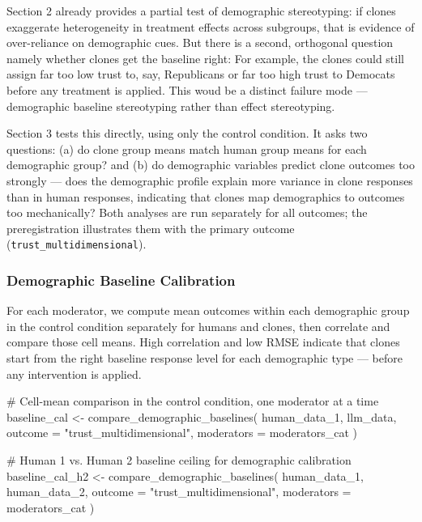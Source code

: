\documentclass[
  letterpaper,
  DIV=11,
  numbers=noendperiod]{scrartcl}
\newenvironment{Shaded}{\begin{snugshade}}{\end{snugshade}}
\newcommand{\AttributeTok}[1]{\textcolor[rgb]{0.40,0.45,0.13}{#1}}
\newcommand{\CommentTok}[1]{\textcolor[rgb]{0.37,0.37,0.37}{#1}}
\newcommand{\FunctionTok}[1]{\textcolor[rgb]{0.28,0.35,0.67}{#1}}
\newcommand{\NormalTok}[1]{\textcolor[rgb]{0.00,0.23,0.31}{#1}}
\newcommand{\OtherTok}[1]{\textcolor[rgb]{0.00,0.23,0.31}{#1}}
\newcommand{\StringTok}[1]{\textcolor[rgb]{0.13,0.47,0.30}{#1}}
\begin{document}
Section 2 already provides a partial test of demographic stereotyping:
if clones exaggerate heterogeneity in treatment effects across
subgroups, that is evidence of over-reliance on demographic cues. But
there is a second, orthogonal question namely whether clones get the
baseline right: For example, the clones could still assign far too low
trust to, say, Republicans or far too high trust to Democats before any
treatment is applied. This woud be a distinct failure mode ---
demographic baseline stereotyping rather than effect stereotyping.

Section 3 tests this directly, using only the control condition. It asks
two questions: (a) do clone group means match human group means for each
demographic group? and (b) do demographic variables predict clone
outcomes too strongly --- does the demographic profile explain more
variance in clone responses than in human responses, indicating that
clones map demographics to outcomes too mechanically? Both analyses are
run separately for all outcomes; the preregistration illustrates them
with the primary outcome (\texttt{trust\_multidimensional}).

\subsubsection{Demographic Baseline
Calibration}\label{demographic-baseline-calibration-1}

For each moderator, we compute mean outcomes within each demographic
group in the control condition separately for humans and clones, then
correlate and compare those cell means. High correlation and low RMSE
indicate that clones start from the right baseline response level for
each demographic type --- before any intervention is applied.

\begin{Shaded}
\begin{Highlighting}[]
\CommentTok{\# Cell{-}mean comparison in the control condition, one moderator at a time}
\NormalTok{baseline\_cal }\OtherTok{\textless{}{-}} \FunctionTok{compare\_demographic\_baselines}\NormalTok{(}
\NormalTok{  human\_data\_1, llm\_data,}
  \AttributeTok{outcome    =} \StringTok{"trust\_multidimensional"}\NormalTok{,}
  \AttributeTok{moderators =}\NormalTok{ moderators\_cat}
\NormalTok{)}

\CommentTok{\# Human 1 vs. Human 2 baseline ceiling for demographic calibration}
\NormalTok{baseline\_cal\_h2 }\OtherTok{\textless{}{-}} \FunctionTok{compare\_demographic\_baselines}\NormalTok{(}
\NormalTok{  human\_data\_1, human\_data\_2,}
  \AttributeTok{outcome    =} \StringTok{"trust\_multidimensional"}\NormalTok{,}
  \AttributeTok{moderators =}\NormalTok{ moderators\_cat}
\NormalTok{)}
\end{Highlighting}
\end{Shaded}
\end{document}
